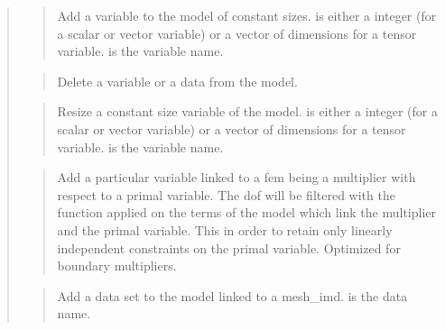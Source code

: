 \documentclass[a4paper,11pt,english]{sphinxmanual}
\begin{document}
\begin{quote}
\sphinxAtStartPar
{}
\begin{quote}

\sphinxAtStartPar
Add a variable to the model of constant sizes.  is either a
integer (for a scalar or vector variable) or a vector of dimensions
for a tensor variable.  is the variable name.
\end{quote}

\sphinxAtStartPar
{}
\begin{quote}

\sphinxAtStartPar
Delete a variable or a data from the model.
\end{quote}

\sphinxAtStartPar
{}
\begin{quote}

\sphinxAtStartPar
Resize a  constant size variable of the model.   is either a
integer (for a scalar or vector variable) or a vector of dimensions
for a tensor variable.  is the variable name.
\end{quote}

\sphinxAtStartPar
{}
\begin{quote}

\sphinxAtStartPar
Add a particular variable linked to a fem being a multiplier with
respect to a primal variable. The dof will be filtered with the
 function applied on the terms of the model
which link the multiplier and the primal variable. This in order to
retain only linearly independent constraints on the primal variable.
Optimized for boundary multipliers.
\end{quote}

\sphinxAtStartPar
{}
\begin{quote}

\sphinxAtStartPar
Add a data set to the model linked to a mesh\_imd.  is the data
name.
\end{quote}


\end{quote}
\end{document}
